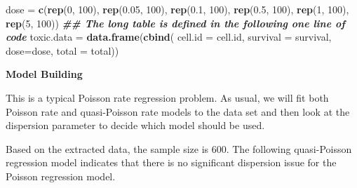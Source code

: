 \documentclass[
]{book}
\newenvironment{Shaded}{\begin{snugshade}}{\end{snugshade}}
\newcommand{\AttributeTok}[1]{\textcolor[rgb]{0.13,0.29,0.53}{#1}}
\newcommand{\DecValTok}[1]{\textcolor[rgb]{0.00,0.00,0.81}{#1}}
\newcommand{\DocumentationTok}[1]{\textcolor[rgb]{0.56,0.35,0.01}{\textbf{\textit{#1}}}}
\newcommand{\FloatTok}[1]{\textcolor[rgb]{0.00,0.00,0.81}{#1}}
\newcommand{\FunctionTok}[1]{\textcolor[rgb]{0.13,0.29,0.53}{\textbf{#1}}}
\newcommand{\NormalTok}[1]{#1}
\newcommand{\OtherTok}[1]{\textcolor[rgb]{0.56,0.35,0.01}{#1}}
\newcommand{\SpecialCharTok}[1]{\textcolor[rgb]{0.81,0.36,0.00}{\textbf{#1}}}
\newcommand{\StringTok}[1]{\textcolor[rgb]{0.31,0.60,0.02}{#1}}
\begin{document}
\begin{Shaded}
\begin{Highlighting}[]
\NormalTok{dose }\OtherTok{=} \FunctionTok{c}\NormalTok{(}\FunctionTok{rep}\NormalTok{(}\DecValTok{0}\NormalTok{, }\DecValTok{100}\NormalTok{), }\FunctionTok{rep}\NormalTok{(}\FloatTok{0.05}\NormalTok{, }\DecValTok{100}\NormalTok{), }\FunctionTok{rep}\NormalTok{(}\FloatTok{0.1}\NormalTok{, }\DecValTok{100}\NormalTok{), }\FunctionTok{rep}\NormalTok{(}\FloatTok{0.5}\NormalTok{, }\DecValTok{100}\NormalTok{), }\FunctionTok{rep}\NormalTok{(}\DecValTok{1}\NormalTok{, }\DecValTok{100}\NormalTok{), }\FunctionTok{rep}\NormalTok{(}\DecValTok{5}\NormalTok{, }\DecValTok{100}\NormalTok{))}
\DocumentationTok{\#\# The long table is defined in the following one line of code}
\NormalTok{toxic.data }\OtherTok{=} \FunctionTok{data.frame}\NormalTok{(}\FunctionTok{cbind}\NormalTok{( }\AttributeTok{cell.id =}\NormalTok{ cell.id, }\AttributeTok{survival =}\NormalTok{ survival, }\AttributeTok{dose=}\NormalTok{dose, }\AttributeTok{total =}\NormalTok{ total))}
\end{Highlighting}
\end{Shaded}

\textbf{Model Building}

This is a typical Poisson rate regression problem. As usual, we will fit both Poisson rate and quasi-Poisson rate models to the data set and then look at the dispersion parameter to decide which model should be used.

Based on the extracted data, the sample size is 600. The following quasi-Poisson regression model indicates that there is no significant dispersion issue for the Poisson regression model.

\begin{Shaded}
\end{Shaded}
\end{document}
